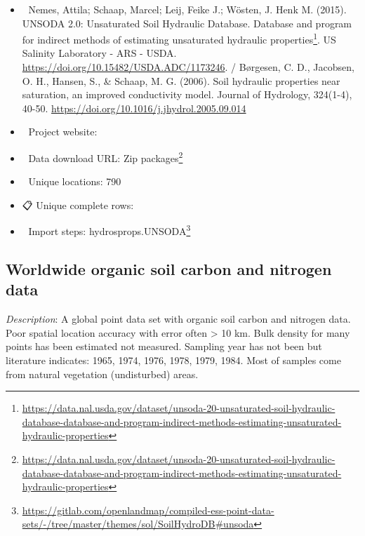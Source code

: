 \documentclass[
  graybox,natbib,nospthms]{svmono}
\providecommand{\tightlist}{%
  \setlength{\itemsep}{0pt}\setlength{\parskip}{0pt}}
\providecommand{\tightlist}{\setlength{\itemsep}{0pt}\setlength{\parskip}{0pt}}
\renewcommand{\href}[2]{#2 (\url{#1})}
\renewcommand{\href}[2]{#2\footnote{\url{#1}}}
\begin{document}
\begin{itemize}
\tightlist
\item
  📕 Nemes, Attila; Schaap, Marcel; Leij, Feike J.; Wösten, J. Henk M.
  (2015). \href{https://data.nal.usda.gov/dataset/unsoda-20-unsaturated-soil-hydraulic-database-database-and-program-indirect-methods-estimating-unsaturated-hydraulic-properties}{UNSODA 2.0: Unsaturated Soil Hydraulic Database. Database and program for indirect methods of estimating unsaturated hydraulic properties}. US Salinity Laboratory - ARS - USDA. \url{https://doi.org/10.15482/USDA.ADC/1173246}. / Børgesen, C. D., Jacobsen, O. H., Hansen, S., \& Schaap, M. G. (2006). Soil hydraulic properties near saturation, an improved conductivity model. Journal of Hydrology, 324(1-4), 40-50. \url{https://doi.org/10.1016/j.jhydrol.2005.09.014}
\item
  🔗 Project website:\\
\item
  📂 Data download URL: \href{https://data.nal.usda.gov/dataset/unsoda-20-unsaturated-soil-hydraulic-database-database-and-program-indirect-methods-estimating-unsaturated-hydraulic-properties}{Zip packages}\\
\item
  📍 Unique locations: 790\\
\item
  📋 Unique complete rows:\\
\item
  📝 Import steps: \href{https://gitlab.com/openlandmap/compiled-ess-point-data-sets/-/tree/master/themes/sol/SoilHydroDB\#unsoda}{hydrosprops.UNSODA}
\end{itemize}

\hypertarget{worldwide-organic-soil-carbon-and-nitrogen-data}{%
\subsection{Worldwide organic soil carbon and nitrogen data}\label{worldwide-organic-soil-carbon-and-nitrogen-data}}

\emph{Description}: A global point data set with organic soil carbon and nitrogen data.
Poor spatial location accuracy with error often \textgreater{} 10 km. Bulk density for many points has been
estimated not measured. Sampling year has not been but literature indicates:
1965, 1974, 1976, 1978, 1979, 1984. Most of samples come from natural vegetation (undisturbed) areas.
\end{document}

